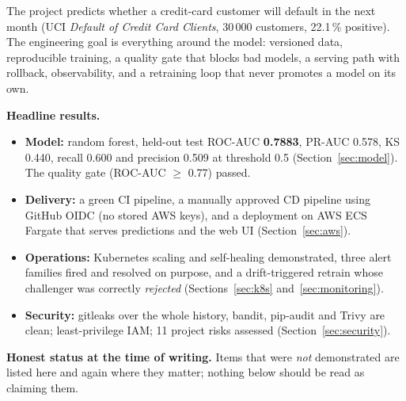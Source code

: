 \documentclass[11pt,a4paper]{article}
\begin{document}
The project predicts whether a credit-card customer will default in the next month (UCI \emph{Default of Credit Card Clients}, 30\,000 customers, 22.1\,\% positive). The engineering goal is everything around the model: versioned data, reproducible training, a quality gate that blocks bad models, a serving path with rollback, observability, and a retraining loop that never promotes a model on its own.

\textbf{Headline results.}
\begin{itemize}
\item \textbf{Model:} random forest, held-out test ROC-AUC \textbf{0.7883}, PR-AUC 0.578, KS 0.440, recall 0.600 and precision 0.509 at threshold 0.5 (Section~\ref{sec:model}). The quality gate (ROC-AUC $\geq$ 0.77) passed.
\item \textbf{Delivery:} a green CI pipeline, a manually approved CD pipeline using GitHub OIDC (no stored AWS keys), and a deployment on AWS ECS Fargate that serves predictions and the web UI (Section~\ref{sec:aws}).
\item \textbf{Operations:} Kubernetes scaling and self-healing demonstrated, three alert families fired and resolved on purpose, and a drift-triggered retrain whose challenger was correctly \emph{rejected} (Sections~\ref{sec:k8s} and~\ref{sec:monitoring}).
\item \textbf{Security:} gitleaks over the whole history, bandit, pip-audit and Trivy are clean; least-privilege IAM; 11 project risks assessed (Section~\ref{sec:security}).
\end{itemize}

\textbf{Honest status at the time of writing.} Items that were \emph{not} demonstrated are listed here and again where they matter; nothing below should be read as claiming them.
\end{document}
